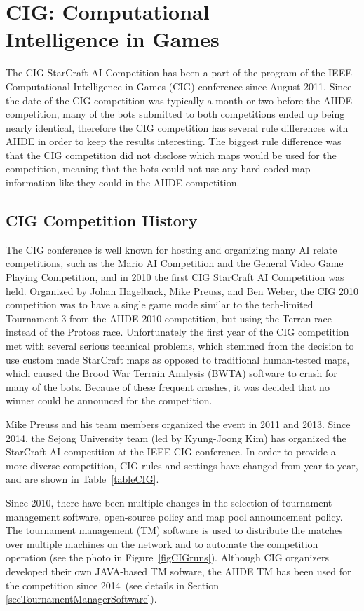 \section{CIG: Computational\\ Intelligence in Games}\label{subsecCIG}

The CIG StarCraft AI Competition has been a part of the program of the IEEE Computational Intelligence in Games (CIG) conference since August 2011.  Since the date of the CIG competition was typically a month or two before the AIIDE competition, many of the bots submitted to both competitions ended up being nearly identical, therefore the CIG competition has several rule differences with AIIDE in order to keep the results interesting. The biggest rule difference was that the CIG competition did not disclose which maps would be used for the competition, meaning that the bots could not use any hard-coded map information like they could in the AIIDE competition.

\subsection{CIG Competition History}
The CIG conference is well known for hosting and organizing many AI relate competitions, such as the Mario AI Competition and the General Video Game Playing Competition, and in 2010 the first CIG StarCraft AI Competition was held. Organized by Johan Hagelback, Mike Preuss, and Ben Weber, the CIG 2010 competition was to have a single game mode similar to the tech-limited Tournament 3 from the AIIDE 2010 competition, but using the Terran race instead of the Protoss race. Unfortunately the first year of the CIG competition met with several serious technical problems, which stemmed from the decision to use custom made StarCraft maps as opposed to traditional human-tested maps, which caused the Brood War Terrain Analysis (BWTA) software to crash for many of the bots. Because of these frequent crashes, it was decided that no winner could be announced for the competition. 

Mike Preuss and his team members organized the event in 2011 and 2013. Since 2014, the Sejong University team (led by Kyung-Joong Kim) has organized the StarCraft AI competition at the IEEE CIG conference. In order to provide a more diverse competition, CIG rules and settings have changed from year to year, and are shown in Table~\ref{tableCIG}. 

Since 2010, there have been multiple changes in the selection of tournament management software, open-source policy and map pool announcement policy. The tournament management (TM) software is used to distribute the matches over multiple machines on the network and to automate the competition operation (see the photo in Figure~\ref{figCIGruns}). Although CIG organizers developed their own JAVA-based TM sofware, the AIIDE TM has been used for the competition since 2014~(see details in Section \ref{secTournamentManagerSoftware}). 

